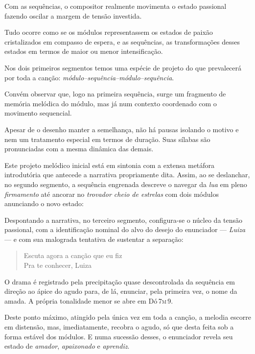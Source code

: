 Com as sequências, o compositor realmente movimenta o estado passional
fazendo oscilar a margem de tensão investida.

Tudo ocorre como se os módulos representassem os estados de paixão
cristalizados em compasso de espera, e as sequências, as transformações
desses estados em termos de maior ou menor intensificação.

Nos dois primeiros segmentos temos uma espécie de projeto do que
prevalecerá por toda a canção: \textit{módulo--sequência--módulo--sequência}.



Convém observar que, logo na primeira sequência, surge um fragmento de
memória melódica do módulo, mas já num contexto coordenado com o
movimento sequencial.


Apesar de o desenho manter a semelhança, não há pausas isolando o motivo
e nem um tratamento especial em termos de duração. Suas sílabas são
pronunciadas com a mesma dinâmica das demais.

Este projeto melódico inicial está em sintonia com a extensa metáfora
introdutória que antecede a narrativa propriamente dita. Assim, ao se
deslanchar, no segundo segmento, a sequência engrenada descreve o
navegar da \textit{lua} em pleno \textit{firmamento} até ancorar no \textit{trovador
cheio de estrelas} com dois módulos anunciando o novo estado:


Despontando a narrativa, no terceiro segmento, configura-se o núcleo da
tensão passional, com a identificação nominal do alvo do desejo do
enunciador --- \textit{Luiza} --- e com sua malograda tentativa de sustentar a
separação:

\begin{verse}
\small{Escuta agora a canção que eu fiz\\
Pra te conhecer, Luiza}
\end{verse}

O drama é registrado pela precipitação quase descontrolada da sequência
em direção ao ápice do agudo para, de lá, enunciar, pela primeira vez, o
nome da amada. A própria tonalidade menor se abre em Dó\,\textsc{7m\,9}.


Deste ponto máximo, atingido pela única vez em toda a canção, a melodia
escorre em distensão, mas, imediatamente, recobra o agudo, só que desta
feita sob a forma estável dos módulos. E numa sucessão desses, o
enunciador revela seu estado de \textit{amador}, \textit{apaixonado} e
\textit{aprendiz}.

